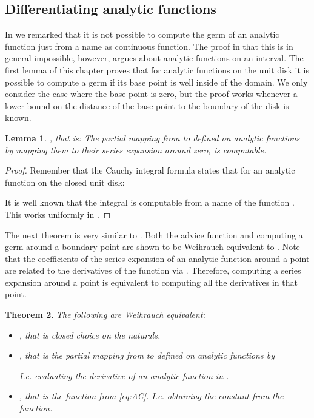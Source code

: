 \documentclass{eptcs-modified}
\newtheorem{theorem}{Theorem}
\newtheorem{lemma}[theorem]{Lemma}
\begin{document}
		\subsection{Differentiating analytic functions}

			In  we remarked that it is not possible to compute the germ of an analytic function just from a name as continuous function.
			The proof in \cite{Muller1995} that this is in general impossible, however, argues about analytic functions on an interval.
			The first lemma of this chapter proves that for analytic functions on the unit disk it is possible to compute a germ if its base point is well inside of the domain.
			We only consider the case where the base point is zero, but the proof works whenever a lower bound on the distance of the base point to the boundary of the disk is known.

			\begin{lemma}\label{lemma:computing germ}
				, that is: The partial mapping from  to  defined on analytic functions by mapping them to their series expansion around zero, is computable.
			\end{lemma}

			\begin{proof}
				Remember that the Cauchy integral formula states that for an analytic function  on the closed unit disk:
				
				It is well known that the integral is computable from a name of the function .
				This works uniformly in .
			\end{proof}

			The next theorem is very similar to .
			Both the advice function  and computing a germ around a boundary point are shown to be Weihrauch equivalent to .
			Note that the coefficients of the series expansion  of an analytic function  around a point  are related to the derivatives  of the function via .
			Therefore, computing a series expansion around a point is equivalent to computing all the derivatives in that point.

			\begin{theorem}\label{thm:main functions}
				The following are Weihrauch equivalent:
				\begin{itemize}
					\item \textbf{}, that is closed choice on the naturals.
					\item \textbf{}, that is the partial mapping from  to  defined on analytic functions by
					
					I.e. evaluating the derivative of an analytic function in .
					\item \textbf{}, that is the function from \cref{eq:AC}. I.e. obtaining the constant from the function.
				\end{itemize}
			\end{theorem}
\end{document}
